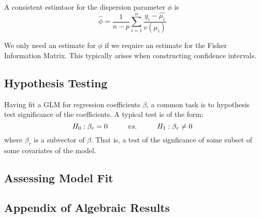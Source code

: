 \begin{lemma}
    A consistent estimtaor for the dispersion parameter $\phi$ is 
    $$\hat{\phi} = \frac{1}{n-p}\sum_{i=1}^{n}\frac{y_i - \hat{\mu_i}}{v(\mu_i)}$$
\end{lemma}
\begin{note}
    We only need an estimate for $\phi$ if we require an estimate for the Fisher Information Matrix. This typically arises when constructing confidence intervals.
\end{note}

\subsection{Hypothesis Testing}
Having fit a GLM for regression coefficients $\beta$, a common task is to hypothesis test significance of the coefficients. A typical test is of the form: 
$$H_0: \beta_r = 0 \hspace{10mm} vs. \hspace{10mm} H_1: \beta_r \neq 0$$
where $\beta_r$ is a subvector of $\beta$. That is, a test of the signficance of some subset of some covariates of the model.
\subsection{Assessing Model Fit}

\subsection{Appendix of Algebraic Results}
